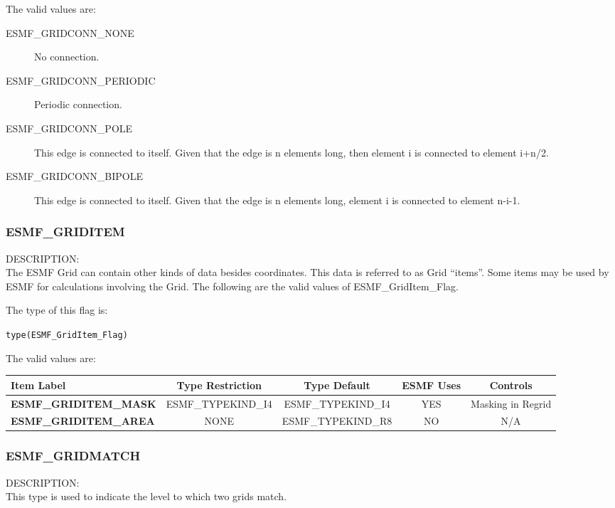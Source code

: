The valid values are:
\begin{description}
\item [ESMF\_GRIDCONN\_NONE] No connection.

\item [ESMF\_GRIDCONN\_PERIODIC] Periodic connection.

\item [ESMF\_GRIDCONN\_POLE] This edge is connected to itself. Given
that the edge is n elements long, then element i is connected to
element i+n/2.

\item [ESMF\_GRIDCONN\_BIPOLE] This edge is connected to itself. Given
that the edge is n elements long, element i is connected to element n-i-1.
\end{description}


\subsubsection{ESMF\_GRIDITEM}
\label{const:griditem}

{\sf DESCRIPTION:\\}
The ESMF Grid can contain other kinds of data besides coordinates. 
This data is referred to as Grid ``items''. Some items may be used
by ESMF for calculations involving the Grid. The following
are the valid values of ESMF\_GridItem\_Flag.

The type of this flag is:

{\tt type(ESMF\_GridItem\_Flag)}

The valid values are:
\begin{tabular}{|l|c|c|c|c||}
\hline
\hline
Item Label & {\bf Type Restriction}  & {\bf Type Default} & {\bf ESMF Uses} & {\bf Controls} \\
\hline
{\bf ESMF\_GRIDITEM\_MASK}  & ESMF\_TYPEKIND\_I4 & ESMF\_TYPEKIND\_I4 & YES & Masking in Regrid \\
{\bf ESMF\_GRIDITEM\_AREA} & NONE & ESMF\_TYPEKIND\_R8 & NO & N/A \\
\hline
\hline
\end{tabular}


\subsubsection{ESMF\_GRIDMATCH}
\label{const:gridmatch}

{\sf DESCRIPTION:\\}
 This type is used to indicate the level to which two grids match.

